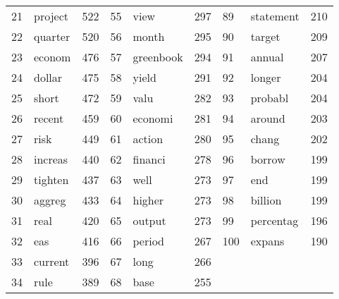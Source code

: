 \begin{tabular}{rlrrlrlll}
 21 &   project &   522 &  55 &       view &   297 &   89 &  statement &   210 \\
 22 &   quarter &   520 &  56 &      month &   295 &   90 &     target &   209 \\
 23 &    econom &   476 &  57 &  greenbook &   294 &   91 &     annual &   207 \\
 24 &    dollar &   475 &  58 &      yield &   291 &   92 &     longer &   204 \\
 25 &     short &   472 &  59 &       valu &   282 &   93 &    probabl &   204 \\
 26 &    recent &   459 &  60 &    economi &   281 &   94 &     around &   203 \\
 27 &      risk &   449 &  61 &     action &   280 &   95 &      chang &   202 \\
 28 &   increas &   440 &  62 &    financi &   278 &   96 &     borrow &   199 \\
 29 &   tighten &   437 &  63 &       well &   273 &   97 &        end &   199 \\
 30 &    aggreg &   433 &  64 &     higher &   273 &   98 &    billion &   199 \\
 31 &      real &   420 &  65 &     output &   273 &   99 &  percentag &   196 \\
 32 &       eas &   416 &  66 &     period &   267 &  100 &     expans &   190 \\
 33 &   current &   396 &  67 &       long &   266 &      &            &       \\
 34 &      rule &   389 &  68 &       base &   255 &      &            &       \\
\bottomrule
\end{tabular}

